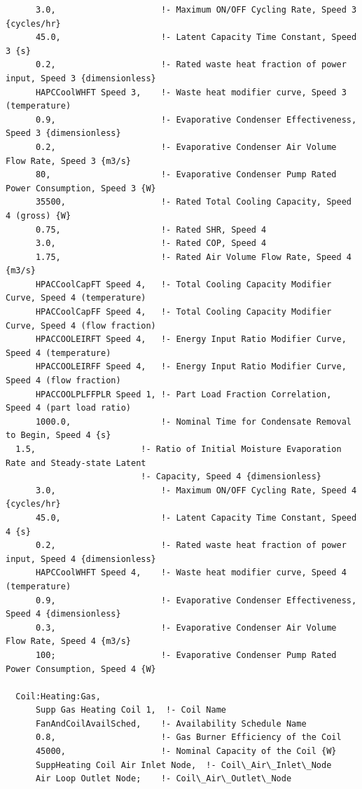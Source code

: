 \begin{lstlisting}
      3.0,                     !- Maximum ON/OFF Cycling Rate, Speed 3 {cycles/hr}
      45.0,                    !- Latent Capacity Time Constant, Speed 3 {s}
      0.2,                     !- Rated waste heat fraction of power input, Speed 3 {dimensionless}
      HAPCCoolWHFT Speed 3,    !- Waste heat modifier curve, Speed 3 (temperature)
      0.9,                     !- Evaporative Condenser Effectiveness, Speed 3 {dimensionless}
      0.2,                     !- Evaporative Condenser Air Volume Flow Rate, Speed 3 {m3/s}
      80,                      !- Evaporative Condenser Pump Rated Power Consumption, Speed 3 {W}
      35500,                   !- Rated Total Cooling Capacity, Speed 4 (gross) {W}
      0.75,                    !- Rated SHR, Speed 4
      3.0,                     !- Rated COP, Speed 4
      1.75,                    !- Rated Air Volume Flow Rate, Speed 4 {m3/s}
      HPACCoolCapFT Speed 4,   !- Total Cooling Capacity Modifier Curve, Speed 4 (temperature)
      HPACCoolCapFF Speed 4,   !- Total Cooling Capacity Modifier Curve, Speed 4 (flow fraction)
      HPACCOOLEIRFT Speed 4,   !- Energy Input Ratio Modifier Curve, Speed 4 (temperature)
      HPACCOOLEIRFF Speed 4,   !- Energy Input Ratio Modifier Curve, Speed 4 (flow fraction)
      HPACCOOLPLFFPLR Speed 1, !- Part Load Fraction Correlation, Speed 4 (part load ratio)
      1000.0,                  !- Nominal Time for Condensate Removal to Begin, Speed 4 {s}
  1.5,                     !- Ratio of Initial Moisture Evaporation Rate and Steady-state Latent
                           !- Capacity, Speed 4 {dimensionless}
      3.0,                     !- Maximum ON/OFF Cycling Rate, Speed 4 {cycles/hr}
      45.0,                    !- Latent Capacity Time Constant, Speed 4 {s}
      0.2,                     !- Rated waste heat fraction of power input, Speed 4 {dimensionless}
      HAPCCoolWHFT Speed 4,    !- Waste heat modifier curve, Speed 4 (temperature)
      0.9,                     !- Evaporative Condenser Effectiveness, Speed 4 {dimensionless}
      0.3,                     !- Evaporative Condenser Air Volume Flow Rate, Speed 4 {m3/s}
      100;                     !- Evaporative Condenser Pump Rated Power Consumption, Speed 4 {W}

  Coil:Heating:Gas,
      Supp Gas Heating Coil 1,  !- Coil Name
      FanAndCoilAvailSched,    !- Availability Schedule Name
      0.8,                     !- Gas Burner Efficiency of the Coil
      45000,                   !- Nominal Capacity of the Coil {W}
      SuppHeating Coil Air Inlet Node,  !- Coil\_Air\_Inlet\_Node
      Air Loop Outlet Node;    !- Coil\_Air\_Outlet\_Node


\end{lstlisting}

